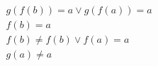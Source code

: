 \begin{align*}
%
& g(f(b)) = a \lor g(f(a)) = a
~\\~
& f(b) = a
~\\~
& f(b)  \neq  f(b) \lor f(a) = a
~\\~
& g(a)  \neq  a
%
\end{align*}
